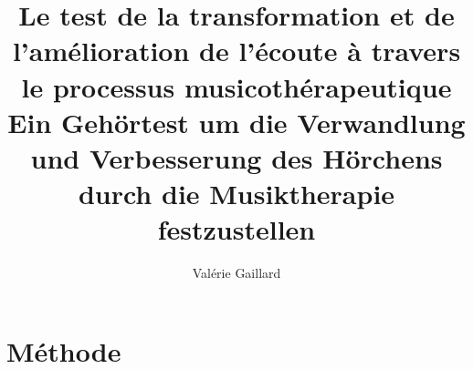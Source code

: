 \documentclass[12pt,pagesize, DIV=14, oneside, headsepline,
titlepage,parskip, headings=small, listof=totoc, 
bibliography=totoc,index=totoc, captions=tableheading, final]{scrreprt}
\title{Le test de la transformation et de l'amélioration de l'écoute à travers le
  processus musicothérapeutique\\
Ein Gehörtest um die Verwandlung und Verbesserung des Hörchens durch
die Musiktherapie festzustellen}
\author{Valérie Gaillard}
\begin{document}
\part{Méthode}

\tableofcontents


 






\appendix

%
\nocite{*} %
\label{bibliographie}
\printbibliography
\end{document}
